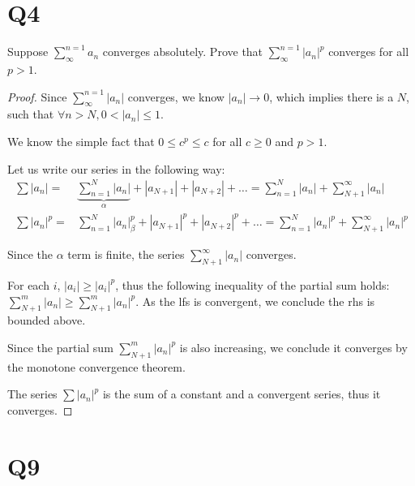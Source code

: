 \documentclass[12pt]{article}
\begin{document}
\section{Q4}

Suppose $\sum^{n=1}_{\infty} a_n $ converges absolutely. Prove that $\sum^{n=1}_{\infty} |a_n|^p $ converges for all $p>1$.

\begin{proof}
	Since $\sum^{n=1}_{\infty} |a_n| $ converges, we know $|a_n| \rightarrow 0$, which implies there is a $N$, such that $\forall n>N, 0<|a_n| \leq 1 $.

	We know the simple fact that $0 \leq c^p\leq c$ for all $c \geq 0$ and $p > 1$.
	
	Let us write our series in the following way:
	\begin{equation}
		\begin{split}
			\sum |a_n| =&
				\underbrace{\sum_{n=1}^{N} |a_n|}_{\alpha}
				+ |a_{N+1}| + |a_{N+2}| + \dots = 
				\sum^{N}_{n=1} |a_n| + \sum^{\infty}_{N+1} |a_n|  \\
			\sum |a_n|^p =&
				\sum_{n=1}^{N} |a_n|^p_{\beta} 
				+ |a_{N+1}|^p + |a_{N+2}|^p + \dots =
				\sum^{N}_{n=1} |a_n|^p + \sum^{\infty}_{N+1} |a_n|^p
		\end{split}
	\end{equation}

	Since the $\alpha$ term is finite, the series $\sum^{\infty}_{N+1} |a_n|$ converges.
	
	For each $i$, $|a_i| \geq |a_i|^p$, thus the following inequality of the partial sum holds:
	$\sum^{m}_{N+1} |a_n| \geq \sum^{m}_{N+1} |a_n|^p $. As the lfs is convergent, we conclude the rhs is bounded above.

	Since the partial sum $\sum^{m}_{N+1} |a_n|^p $ is also increasing, we conclude it converges by the monotone convergence theorem.
	
	The series $\sum |a_n|^p$ is the sum of a constant and a convergent series, thus it converges.
\end{proof}

\newpage

\section{Q9}
\end{document}
